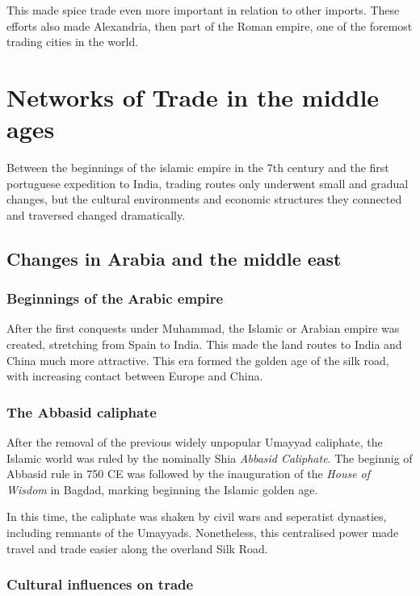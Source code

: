 \documentclass[11pt, a4paper, headings=standardclasses]{scrartcl}
\begin{document}
This made spice trade even more important in relation to other imports.\autocite{SilkRome, Rome} These efforts also made Alexandria, then part of the Roman empire, one of the foremost trading cities in the world.\autocite{SpiceTrade}
\section{Networks of Trade in the middle ages}

Between the beginnings of the islamic empire in the 7th century and the first portuguese expedition to India, trading routes only underwent small and gradual changes, but the cultural environments and economic structures they connected and traversed changed dramatically.

\subsection{Changes in Arabia and the middle east}

\subsubsection{Beginnings of the Arabic empire}
After the first conquests under Muhammad, the Islamic or Arabian empire was created, stretching from Spain to India\autocite[Section \textit{Achievements}]{Umayyad}. This made the land routes to India and China much more attractive. This era formed the golden age of the silk road, with increasing contact between Europe and China.

\subsubsection{The Abbasid caliphate}

After the removal of the previous widely unpopular\autocite{Umayyad} Umayyad caliphate, the Islamic world was ruled by the nominally Shia \emph{Abbasid Caliphate}. The beginnig of Abbasid rule in 750 CE was followed by the inauguration of the \emph{House of Wisdom} in Bagdad, marking beginning the Islamic golden age.\autocite{Abbasid}

In this time, the caliphate was shaken by civil wars and seperatist dynasties, including remnants of the Umayyads.\autocite[Section \textit{End}]{Umayyad} Nonetheless, this centralised power made travel and trade easier along the overland Silk Road.

\subsubsection{Cultural influences on trade}
\end{document}
